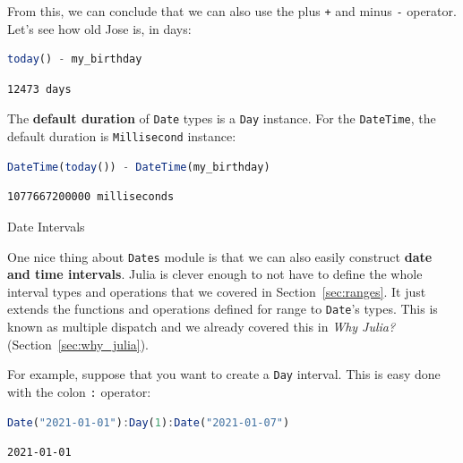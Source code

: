 \documentclass[
  notoc %
]{tufte-book}
\makeatletter
\newcommand{\passthrough}[1]{#1}
\renewcommand\subsubsection{%
\@startsection{subsubsection}{3}{\z@ }{-3.25ex\@plus -1ex \@minus -.2ex}{1.5ex \@plus .2ex}{\normalfont \normalsize \bfseries }
}
\makeatother
\begin{document}
From this, we can conclude that we can also use the plus
\passthrough{\lstinline!+!} and minus \passthrough{\lstinline!-!}
operator. Let's see how old Jose is, in days:

\begin{lstlisting}[language=Julia]
today() - my_birthday
\end{lstlisting}

\begin{lstlisting}[language=Output]
12473 days
\end{lstlisting}

The \textbf{default duration} of \passthrough{\lstinline!Date!} types is
a \passthrough{\lstinline!Day!} instance. For the
\passthrough{\lstinline!DateTime!}, the default duration is
\passthrough{\lstinline!Millisecond!} instance:

\begin{lstlisting}[language=Julia]
DateTime(today()) - DateTime(my_birthday)
\end{lstlisting}

\begin{lstlisting}[language=Output]
1077667200000 milliseconds
\end{lstlisting}

\hypertarget{sec:dates_intervals}{%
\subsubsection{Date Intervals}\label{sec:dates_intervals}}

One nice thing about \passthrough{\lstinline!Dates!} module is that we
can also easily construct \textbf{date and time intervals}. Julia is
clever enough to not have to define the whole interval types and
operations that we covered in Section~\ref{sec:ranges}. It just extends
the functions and operations defined for range to
\passthrough{\lstinline!Date!}'s types. This is known as multiple
dispatch and we already covered this in \emph{Why Julia?}
(Section~\ref{sec:why_julia}).

For example, suppose that you want to create a
\passthrough{\lstinline!Day!} interval. This is easy done with the colon
\passthrough{\lstinline!:!} operator:

\begin{lstlisting}[language=Julia]
Date("2021-01-01"):Day(1):Date("2021-01-07")
\end{lstlisting}

\begin{lstlisting}[language=Output]
2021-01-01
\end{lstlisting}
\end{document}
